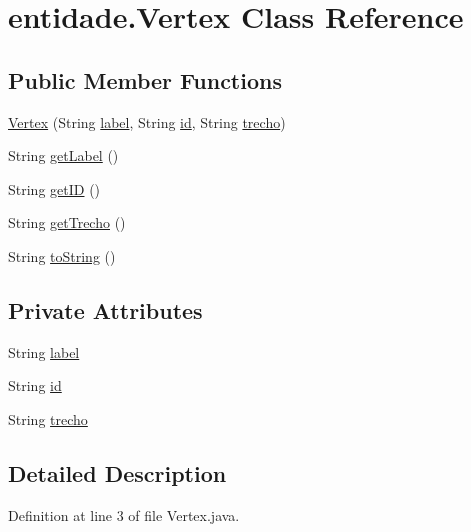 \hypertarget{classentidade_1_1Vertex}{}\section{entidade.\+Vertex Class Reference}
\label{classentidade_1_1Vertex}
\subsection*{Public Member Functions}
\begin{DoxyCompactItemize}
\item 
\hyperlink{classentidade_1_1Vertex_aefdd380ec5284dedc3d0e6b9d23a535a}{Vertex} (String \hyperlink{classentidade_1_1Vertex_a86c6f2ce5703dc144ec54026caaed1ea}{label}, String \hyperlink{classentidade_1_1Vertex_a39a2b03733748fe6bd89bbb253dddc2b}{id}, String \hyperlink{classentidade_1_1Vertex_af58a487a697cce6ba2e454501fb312af}{trecho})
\item 
String \hyperlink{classentidade_1_1Vertex_a29b7642968d6ac8634e004c223dfac59}{get\+Label} ()
\item 
String \hyperlink{classentidade_1_1Vertex_adab44db0925eba2da27edc6f9670f2b5}{get\+ID} ()
\item 
String \hyperlink{classentidade_1_1Vertex_ad70170f4e7e3b700ac8042024034e311}{get\+Trecho} ()
\item 
String \hyperlink{classentidade_1_1Vertex_a152cee1b8109d23baa3f1e2d194b0e48}{to\+String} ()
\end{DoxyCompactItemize}
\subsection*{Private Attributes}
\begin{DoxyCompactItemize}
\item 
String \hyperlink{classentidade_1_1Vertex_a86c6f2ce5703dc144ec54026caaed1ea}{label}
\item 
String \hyperlink{classentidade_1_1Vertex_a39a2b03733748fe6bd89bbb253dddc2b}{id}
\item 
String \hyperlink{classentidade_1_1Vertex_af58a487a697cce6ba2e454501fb312af}{trecho}
\end{DoxyCompactItemize}


\subsection{Detailed Description}


Definition at line 3 of file Vertex.\+java.




